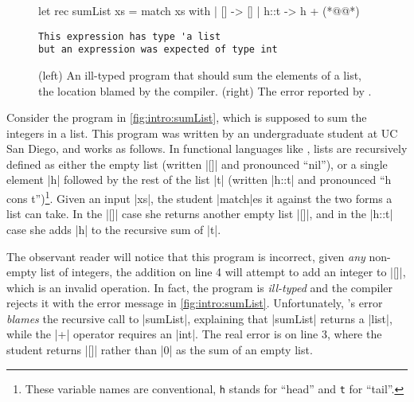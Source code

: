 \begin{figure}[t]
\small
\begin{minipage}{0.45\linewidth}
\begin{ecode}
let rec sumList xs =
  match xs with
  | []   -> []
  | h::t -> h + (*@@*)
\end{ecode}
\end{minipage}
\begin{minipage}{0.5\linewidth}
\begin{verbatim}
This expression has type 'a list
but an expression was expected of type int
\end{verbatim}
\end{minipage}
\caption[(left) An ill-typed \ocaml program that should sum the elements of a
  list, highlighting the location blamed by the \ocaml compiler.
  (right) The error reported by \ocaml.]{
  (left) An ill-typed \ocaml program that should sum the elements of a
  list,  the location blamed by the \ocaml compiler.
  (right) The error reported by \ocaml.}
\label{fig:intro:sumList}
\end{figure}

Consider the \ocaml program in \autoref{fig:intro:sumList}, which is
supposed to sum the integers in a list.
%
This program was written by an undergraduate student at UC San Diego,
and works as follows.
%
In functional languages like \ocaml, lists are recursively defined as
either the empty list (written |[]| and pronounced ``nil''), or a single
element |h| followed by the rest of the list |t| (written |h::t| and
pronounced ``h cons t'')\footnote{These variable names are conventional,
  \texttt{h} stands for ``head'' and \texttt{t} for ``tail''.}.
%
Given an input |xs|, the student |match|es it against the
two forms a list can take.
%
In the |[]| case she returns another empty list |[]|, and in the
|h::t| case she adds |h| to the recursive sum of |t|.

The observant reader will notice that this program is incorrect, given
\emph{any} non-empty list of integers, the addition on line 4 will
attempt to add an integer to |[]|, which is an invalid operation.
%
In fact, the program is \emph{ill-typed} and the \ocaml compiler rejects
it with the error message in \autoref{fig:intro:sumList}.
%
Unfortunately, \ocaml's error \emph{blames} the recursive call to
|sumList|, explaining that |sumList| returns a |list|, while the |+|
operator requires an |int|.
%
The real error is on line 3, where the student returns |[]| rather than
|0| as the sum of an empty list.

